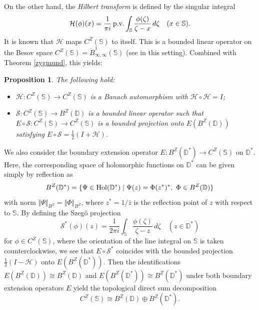 \documentclass[amstex]{amsart}
\newtheorem{proposition}[theorem]{Proposition}
\theoremstyle{definition}
\theoremstyle{remark}
\numberwithin{equation}{section}
\begin{document}
On the other hand, 
the {\it Hilbert transform} is defined by the singular integral
$$
{\mathcal H}(\phi)(x)=\frac{1}{\pi i}\,{\rm p.v.} \int_{\mathbb S} \frac{\phi(\zeta)}{\zeta-x}\,d \zeta \quad (x \in \mathbb S).
$$
It is known that ${\mathcal H}$ maps $C^Z(\mathbb S)$ to itself.
This is a bounded linear operator on the Besov space $C^Z(\mathbb S)=\dot B^1_{\infty,\infty}(\mathbb S)$
(see \cite[Proposition 4.7]{GP} in this setting). Combined with Theorem \ref{zygmund}, this yields:

\begin{proposition}
The following hold:
\begin{itemize}
\item[$(1)$]
${\mathcal H}:C^Z(\mathbb S) \to C^Z(\mathbb S)$ is a Banach automorphism with ${\mathcal H} \circ {\mathcal H}=I$;
\item[$(2)$]
${\mathcal S}:C^Z(\mathbb S) \to B^Z(\mathbb D)$ is a bounded linear operator such that 
$E \circ {\mathcal S}:C^Z(\mathbb S) \to C^Z(\mathbb S)$ is a bounded projection onto 
$E(B^Z(\mathbb D))$ satisfying 
$E \circ {\mathcal S}=\frac{1}{2}(I +\mathcal H)$.
\end{itemize}
\end{proposition}
\smallskip

We also consider the boundary extension operator $E:B^Z(\mathbb D^*) \to C^Z(\mathbb S)$
on $\mathbb D^*$. Here, the corresponding space of holomorphic functions on $\mathbb D^*$ can be given simply by reflection as
$$
B^Z(\mathbb D^*)=\{\Psi \in {\rm Hol}(\mathbb D^*) \mid \Psi(z)=\Phi(z^*)^*,\ \Phi \in B^Z(\mathbb D)\}
$$ 
with norm $\Vert \Psi \Vert_{B^Z}=\Vert \Phi \Vert_{B^Z}$, where $z^*=1/\bar z$ is the reflection point of $z$
with respect to $\mathbb S$.
By defining the Szeg\"o projection
$$
{\mathcal S}^*(\phi)(z)=\frac{1}{2\pi i} \int_{\mathbb S} \frac{\phi(\zeta)}{\zeta-z}\,d \zeta \quad (z \in \mathbb D^*)
$$
for $\phi \in C^Z(\mathbb S)$, where the orientation of the line integral on $\mathbb S$ is taken counterclockwise, we see that
$E \circ {\mathcal S}^*$ coincides with the bounded projection $\frac{1}{2}(I -\mathcal H)$ 
onto $E(B^Z(\mathbb D^*))$.
Then the identifications $E(B^Z(\mathbb D)) \cong B^Z(\mathbb D)$ and $E(B^Z(\mathbb D^*)) \cong B^Z(\mathbb D^*)$
under both boundary extension operators $E$ yield
the topological direct sum decomposition
\begin{equation}\label{identify}
C^Z(\mathbb S) \cong B^Z(\mathbb D) \oplus B^Z(\mathbb D^*).
\end{equation}
\end{document}
